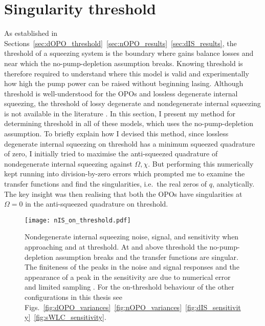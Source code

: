 \section{Singularity threshold}
\label{sec:singularity_threshold}

As established in Sections~\ref{sec:dOPO_threshold}~\ref{sec:nOPO_results}~\ref{sec:dIS_results}, the threshold of a squeezing system is the boundary where gains balance losses and near which  the no-pump-depletion assumption breaks. Knowing threshold is therefore required to understand where this model is valid and experimentally how high the pump power can be raised without beginning lasing. Although threshold is well-understood for the OPOs and lossless degenerate internal squeezing, the threshold of lossy degenerate and nondegenerate internal squeezing is not available in the literature . In this section, I present my method for determining threshold in all of these models, which uses the no-pump-depletion assumption.
To briefly explain how I devised this method, since lossless degenerate internal squeezing on threshold has a minimum squeezed quadrature of zero, I initially tried to maximise the anti-squeezed quadrature of nondegenerate internal squeezing against $\Omega,\chi$. But performing this numerically kept running into division-by-zero errors which prompted me to examine the transfer functions and find the singularities, i.e.\ the real zeros of $q$, analytically. The key insight was then realising that both the OPOs have singularities at $\Omega=0$ in the anti-squeezed quadrature on threshold.

\begin{figure}
    \centering
    \texttt{[image: nIS\_on\_threshold.pdf]}
    \caption{ Nondegenerate internal squeezing noise, signal, and sensitivity when approaching and at threshold. At and above threshold the no-pump-depletion assumption breaks and the transfer functions are singular. The finiteness of the peaks in the noise and signal responses and the appearance of a peak in the sensitivity are due to numerical error and limited sampling . For the on-threshold behaviour of the other configurations in this thesis see Figs.~\ref{fig:dOPO_variances}~\ref{fig:nOPO_variances}~\ref{fig:dIS_sensitivity}~\ref{fig:sWLC_sensitivity}.}
    \label{fig:nIS_on_threshold}
\end{figure}

